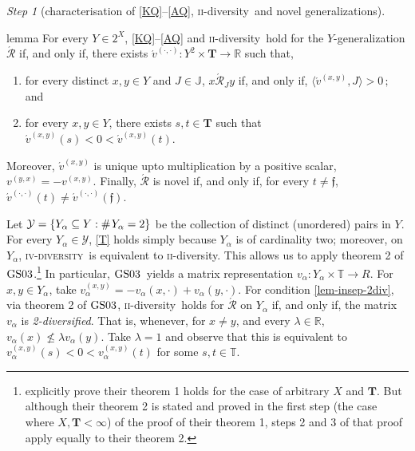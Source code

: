 \documentclass[ecta,nameyear,draft]{econsocart}
\newcommand{\countof}{\mathbin{\#}\hskip1pt}
\newcommand{\R}{\mathbb R}
\newcommand{\mc}{\mathcal}
\newcommand{\novel}{\mathfrak f}
\newcommand{\aext}{\mathrel{\acute{\mathrel{\mathcal R}}}}
\newcommand{\mbbt}{{\mathbf {T}}}
\newcommand{\mbbtpp}{{\mathds{T}}}
\newcommand{\mbbjpp}{\mathds{J}}
\newcommand{\xy}{{(x, y)}}
\newcommand{\yx}{{(y, x)}}
\newcommand{\dd}{{(\cdot,\cdot)}}
\newcommand{\twodiv}{\textsc{ii}-\textup{diversity}}
\newcommand{\fourdiv}{\textsc{iv}-\textsc{diversity}}
\newcommand{\gsii}{$\textup{GS03}$}
\theoremstyle{plain}
\theoremstyle{remark}
\newtheorem{step}{Step}[section]
\begin{document}
\begin{appendix}
\begin{step}[characterisation of \ref{KQ}–\ref{AQ}, \twodiv\ and novel
      generalizations]
    \begin{theoremEnd}{lemma}\label{lem-insep} For every $Y \in 2^{X}$,
      \ref{KQ}--\ref{AQ} and \twodiv\ hold for the $Y$-generalization $\aext$
      if, and only if, there exists $\acute{v}^{\dd}: Y^2 \times \mbbt
      \rightarrow \R$ such that,
      \begin{enumerate}[label=\textup{(\roman*)}]
        \item\label{lem-insep-rep} for every distinct $x, y \in Y$ and $J \in
          \mbbjpp$, $x \aext_J y$ if, and only if, $\langle \acute{v}^{\xy},
          J \rangle > 0$$\,;$ \textup{and}
        \item\label{lem-insep-2div} for every $x, y \in Y$, there exists $s, t
          \in \mbbt$ such that $\acute{v}^{\xy}(s) < 0 < \acute{v}^{\xy}(t)$.
      \end{enumerate}
      Moreover, $\acute{v}^{\xy}$ is unique upto multiplication by a positive
      scalar,  $v^{\yx} = - v^{\xy}$. Finally,  $\aext$ is novel if, and only
      if, for every $t \neq \novel$, $\acute{v}^{\dd}(t) \neq
      \acute{v}^{\dd}(\novel)$.
    \end{theoremEnd}

    \begin{proofEnd}
      Let $\mc Y = \{Y_\alpha \subseteq Y : \countof Y_\alpha = 2\}$ be the
      collection of distinct (unordered) pairs in $Y$. For every $Y_\alpha \in
      \mc Y$, \ref{T} holds simply because $Y_\alpha$ is of cardinality two;
      moreover, on $Y_\alpha$, \fourdiv\ is equivalent to \twodiv. This allows
      us to apply theorem 2 of \gsii.\footnote{\citeauthor{gilboa2003inductive}
        explicitly prove their theorem 1 holds for the case of arbitrary $X$
        and $\mbbt$. But although their theorem 2 is stated and proved in the
        first step (the case where $X, \mbbt < \infty$) of the proof of their
        theorem 1, steps 2 and 3 of that proof apply equally to their theorem
      2.}  In particular, \gsii\ yields a matrix representation $v_\alpha :
      Y_\alpha \times \mbbtpp \rightarrow R$. For $x, y \in Y_\alpha$, take
      $v^{\xy}_{\alpha} = - v_{\alpha}(x, \cdot) + v_{\alpha}(y, \cdot)$. 
      For condition \ref{lem-insep-2div}, via theorem 2 of \gsii, \twodiv\
      holds for $\aext$ on $Y_\alpha$ if, and only if, the matrix $v_\alpha$
      is \emph{2-diversified}. That is, whenever, for $x\neq y$, and every
      $\lambda \in \R$, $v_\alpha (x) \not \leq \lambda v_\alpha(y)$. Take
      $\lambda = 1$ and observe that this is equivalent to
      $v^{\xy}_{\alpha}(s) < 0 < v^{\xy}_{\alpha}(t)$ for some $s, t \in
      \mbbtpp$.
    

\end{proofEnd}
\end{step}
\end{appendix}
\end{document}
